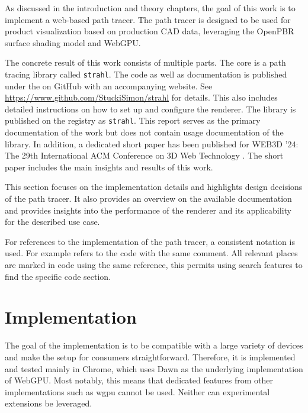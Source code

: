 
As discussed in the introduction and theory chapters, the goal of this work is to implement a web-based path tracer. The path tracer is designed to be used for product visualization based on production \gls{CAD} data, leveraging the \gls{OpenPBR} surface shading model and \gls{WebGPU}.

The concrete result of this work consists of multiple parts. The core is a path tracing library called \texttt{strahl}. The code as well as documentation is published under the  on GitHub with an accompanying website. See \url{https://www.github.com/StuckiSimon/strahl} for details. This also includes detailed instructions on how to set up and configure the renderer. The library is published on the  registry as \texttt{strahl}. This report serves as the primary documentation of the work but does not contain usage documentation of the library. In addition, a dedicated short paper has been published for WEB3D '24: The 29th International ACM Conference on 3D Web Technology \cite{ownShortPaper}. The short paper includes the main insights and results of this work.

This section focuses on the implementation details and highlights design decisions of the path tracer. It also provides an overview on the available documentation and provides insights into the performance of the renderer and its applicability for the described use case.

For references to the implementation of the path tracer, a consistent notation is used. For example  refers to the code with the same comment. All relevant places are marked in code using the same reference, this permits using search features to find the specific code section.

\section{Implementation}

The goal of the implementation is to be compatible with a large variety of devices and make the setup for consumers straightforward. Therefore, it is implemented and tested mainly in Chrome, which uses \gls{Dawn} as the underlying implementation of \gls{WebGPU}. Most notably, this means that dedicated features from other implementations such as \gls{wgpu} cannot be used. Neither can experimental extensions be leveraged.

